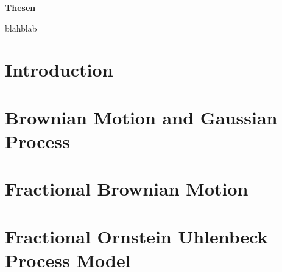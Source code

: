 \documentclass[a4paper, twoside, 11pt]{article}
\renewenvironment{abstract}{
  \begin{center}
  		\Large
		\textbf{Thesen}
		\hspace{2em}
  \end{center}				
}{}
\begin{document}

\newpage

\thispagestyle{empty}
\begin{abstract}
  blahblab
\end{abstract}
\newpage

\thispagestyle{empty}
\mbox{}
\newpage
\fancyhead[LO, RE]{}
\fancyfoot[LE, RO]{}
\tableofcontents
\newpage
\thispagestyle{empty}
\mbox{}
\newpage

\fancyhead[LO, RE]{\rightmark}
\fancyfoot[LE, RO]{\large \thepage}
\setcounter{section}{0}
\setcounter{page}{1}
\section{Introduction}

\newpage

\section{Brownian Motion and Gaussian Process}

\newpage

\section{Fractional Brownian Motion}

\newpage

\section{Fractional Ornstein Uhlenbeck Process Model}

\newpage
\end{document}
